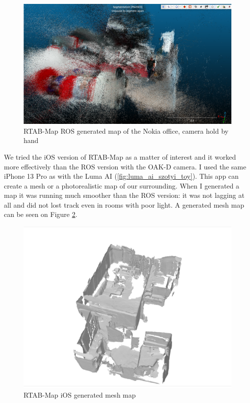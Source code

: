 \begin{figure}[H]
	\centering
	\includegraphics[width=150mm, keepaspectratio]{figures/rtabmap_nokia_office.png}
	\caption{RTAB-Map ROS generated map of the Nokia office, camera hold by hand}
	\label{fig:rtabmap_nokia}
\end{figure}

We tried the iOS version of RTAB-Map as a matter of interest and it worked more effectively than the ROS version with the OAK-D camera. I used the same iPhone 13 Pro as with the Luma AI (\ref{fig:luma_ai_szotyi_toy}). This app can create a mesh or a photorealistic map of our surrounding. When I generated a map it was running much smoother than the ROS version: it was not lagging at all and did not lost track even in rooms with poor light. A generated mesh map can be seen on Figure \ref{fig:rtabmap_ios}.

\begin{figure}[H]
	\centering
	\includegraphics[width=150mm, keepaspectratio]{figures/rtabmap_ios.png}
	\caption{RTAB-Map iOS generated mesh map}
	\label{fig:rtabmap_ios}
\end{figure}

